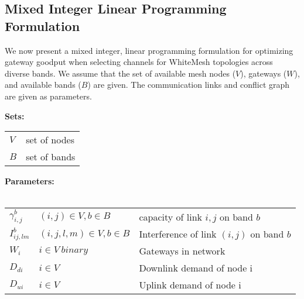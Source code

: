 \subsection{Mixed Integer Linear Programming Formulation}
\label{subsec:linearopt}

We now present a mixed integer, linear programming formulation for 
optimizing gateway goodput when selecting channels
for WhiteMesh topologies across diverse bands. We assume that the
set of available mesh nodes ($V$), gateways ($W$), and available 
bands ($B$) are given.  The communication links and conflict graph 
are given as parameters.

\noindent
{\bf Sets:}
\begin{tabular}{ll}
$V$ & set of nodes \\
$B$ & set of bands \\
\end{tabular}

\noindent
{\bf Parameters:}\\
\\
\begin{tabular}{llp{3.4cm}}
$\gamma_{i,j}^b$ & $(i,j)\in V, b \in B$ & capacity of link $i,j$ on band $b$\\
$I_{ij,lm}^b$ & $(i,j,l,m) \in V, b\in B $ & Interference of link $(i,j)$ on band $b$\\
$W_i$ & $i \in V\ binary$ & Gateways in network\\
$D_{di}$ & $i \in V\ $ & Downlink demand of node i\\
$D_{ui}$ & $i \in V\ $ & Uplink demand of node i\\
\end{tabular}

